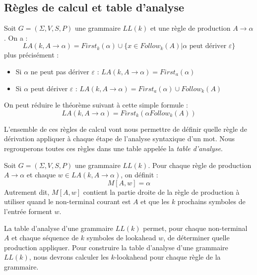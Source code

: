 \subsection{Règles de calcul et table d'analyse}

\begin{theorem}[Calcul de $LA(k)$]
    Soit $G = ( \Sigma, V, S, P)$ une grammaire $LL(k)$ et une règle de production $A \rightarrow \alpha$.
    On a : 
        \[ \boxed{LA(k, A \rightarrow \alpha) = First_k( \alpha) \cup \{x \in Follow_k(A) | \alpha \text{ peut dériver } \varepsilon\}} \] 
    plus précisément : 
    \begin{itemize}
        \item Si $ \alpha$ ne peut pas dériver $ \varepsilon$ : $LA(k, A \rightarrow \alpha) = First_a( \alpha)$ 
        \item Si $ \alpha$ peut dériver $ \varepsilon$ : $ LA(k, A \rightarrow \alpha) = First_a( \alpha) \cup Follow_k(A) $
    \end{itemize}
\end{theorem}

\begin{proposition}
    On peut réduire le théorème suivant à cette simple formule : 
        $$ LA(k, A \to \alpha) = First_k( \alpha Follow_k(A)) $$ 
\end{proposition}

L'ensemble de ces règles de calcul vont nous permettre de définir quelle règle de dérivation appliquer à chaque 
étape de l'analyse syntaxique d'un mot. Nous regrouperons toutes ces règles dans une table appelée la 
\emph{table d'analyse}. 

\begin{definition}
     Soit $G = ( \Sigma, V, S, P)$ une grammaire $LL(k)$. Pour chaque règle de 
     production $A \longrightarrow \alpha$ et chaque $w \in LA(k, A \longrightarrow \alpha)$, on définit : 
        \[ M[A, w] = \alpha \] 
    Autrement dit, $ M[A,w]$ contient la partie droite de la règle de production à utiliser quand le non-terminal 
    courant est $A$ et que les $k$ prochains symboles de l'entrée forment $w$. 
\end{definition}

La table d’analyse d’une grammaire $LL(k)$ permet, pour chaque non-terminal $A$ et chaque séquence de 
$k$ symboles de lookahead $w$, de déterminer quelle production appliquer.
Pour construire la table d'analyse d'une grammaire $LL(k)$, nous devrons calculer les $k$-lookahead 
pour chaque règle de la grammaire. 

